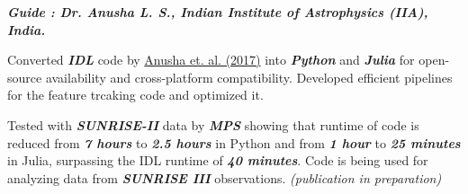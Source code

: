         \begin{onecolentry}
            \textbf{\textit{Guide : Dr. Anusha L. S., Indian Institute of Astrophysics (IIA), India.}}\\

            \vspace{0.10 cm}
            \begin{highlights}
                \item Converted \textit{\textbf{IDL}} code by \href{https://arxiv.org/abs/1608.08499}{Anusha et. al. (2017)}  into \textit{\textbf{Python}} and \textit{\textbf{Julia}} for open-source availability and cross-platform compatibility. Developed efficient pipelines for the feature trcaking code and optimized it. 
                
                \vspace{0.10 cm}
                
                \item Tested with \textit{\textbf{SUNRISE-II}} data by \textit{\textbf{MPS}} showing that runtime of code is reduced from \textit{\textbf{7 hours}} to \textit{\textbf{2.5 hours}} in Python and from \textit{\textbf{1 hour}} to \textit{\textbf{25 minutes}} in Julia, surpassing the IDL runtime of \textit{\textbf{40 minutes}}. Code is being used for analyzing data from \textit{\textbf{SUNRISE III}} observations. \textit{(publication in preparation)}

                
                

\end{highlights}
\end{onecolentry}
